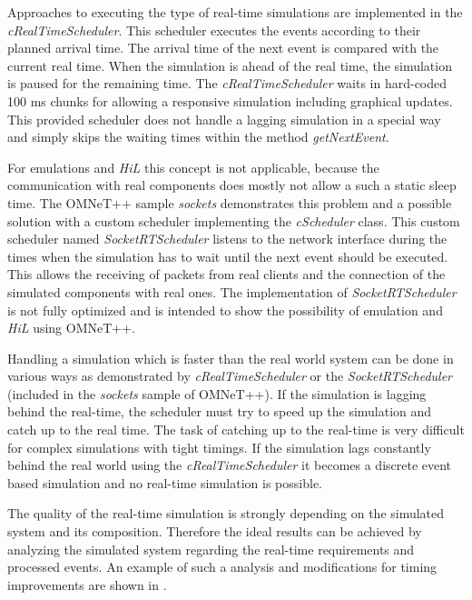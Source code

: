 Approaches to executing the type of real-time simulations are implemented in the \emph{cRealTimeScheduler}.
This scheduler executes the events according to their planned arrival time.
The arrival time of the next event is compared with the current real time.
When the simulation is ahead of the real time, the simulation is paused for the remaining time.
The \emph{cRealTimeScheduler} waits in hard-coded 100 ms chunks for allowing a responsive simulation including graphical updates.
This provided scheduler does not handle a lagging simulation in a special way and simply skips the waiting times within the method \emph{getNextEvent}. \cite[cRealTimeScheduler]{omnet_api}


For emulations and \emph{HiL} this concept is not applicable, because the communication with real components does mostly not allow a such a static sleep time.
The OMNeT++ sample \emph{sockets} demonstrates this problem and a possible solution with a custom scheduler implementing the \emph{cScheduler} class.
This custom scheduler named \emph{SocketRTScheduler} listens to the network interface during the times when the simulation has to wait until the next event should be executed.
This allows the receiving of packets from real clients and the connection of the simulated components with real ones.
The implementation of \emph{SocketRTScheduler} is not fully optimized and is intended to show the possibility of emulation and \emph{HiL} using OMNeT++.

Handling a simulation which is faster than the real world system can be done in various ways as demonstrated by \emph{cRealTimeScheduler} or the \emph{SocketRTScheduler} (included in the \emph{sockets} sample of OMNeT++).
If the simulation is lagging behind the real-time, the scheduler must try to speed up the simulation and catch up to the real time.
The task of catching up to the real-time is very difficult for complex simulations with tight timings.
If the simulation lags constantly behind the real world using the \emph{cRealTimeScheduler} it becomes a discrete event based simulation and no real-time simulation is possible.

The quality of the real-time simulation is strongly depending on the simulated system and its composition.
Therefore the ideal results can be achieved by analyzing the simulated system regarding the real-time requirements and processed events.
An example of such a analysis and modifications for timing improvements are shown in \cite{scussel_improvements_2015}.

